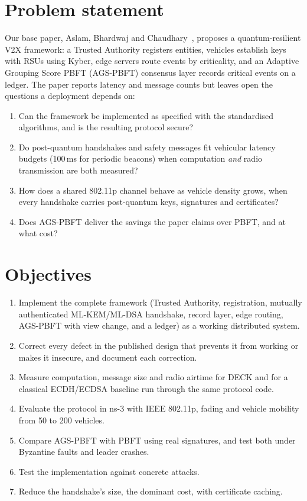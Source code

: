 \section{Problem statement}

Our base paper, Aslam, Bhardwaj and Chaudhary~\cite{base}, proposes a
quantum-resilient V2X framework: a Trusted Authority registers entities,
vehicles establish keys with RSUs using Kyber, edge servers route events by
criticality, and an Adaptive Grouping Score PBFT (AGS-PBFT) consensus layer
records critical events on a ledger. The paper reports latency and message
counts but leaves open the questions a deployment depends on:

\begin{enumerate}
\item Can the framework be implemented as specified with the standardised
algorithms, and is the resulting protocol secure?
\item Do post-quantum handshakes and safety messages fit vehicular latency
budgets (100\,ms for periodic beacons) when computation \emph{and} radio
transmission are both measured?
\item How does a shared 802.11p channel behave as vehicle density grows, when
every handshake carries post-quantum keys, signatures and certificates?
\item Does AGS-PBFT deliver the savings the paper claims over PBFT, and at
what cost?
\end{enumerate}

\section{Objectives}

\begin{enumerate}
\item Implement the complete framework (Trusted Authority, registration,
mutually authenticated ML-KEM/ML-DSA handshake, record layer, edge routing,
AGS-PBFT with view change, and a ledger) as a working distributed system.
\item Correct every defect in the published design that prevents it from
working or makes it insecure, and document each correction.
\item Measure computation, message size and radio airtime for DECK
and for a classical ECDH/ECDSA baseline run through the same
protocol code.
\item Evaluate the protocol in ns-3 with IEEE 802.11p, fading and vehicle
mobility from 50 to 200 vehicles.
\item Compare AGS-PBFT with PBFT using real signatures, and test both under
Byzantine faults and leader crashes.
\item Test the implementation against concrete attacks.
\item Reduce the handshake's size, the dominant cost, with certificate caching.
\end{enumerate}


